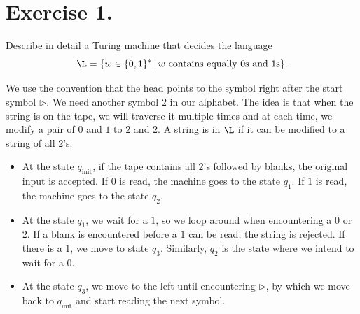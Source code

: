 \section{Exercise 1.} Describe in detail a Turing machine that decides the language
$$\L=\{w\in \{0,1\}^* \,|\, w \text{ contains equally 0s and 1s}\}.$$

We use the convention that the head points to the symbol right after the start symbol $\triangleright$. We need another symbol $2$ in our alphabet. The idea is that when the string is on the tape, we will traverse it multiple times and at each time, we modify a pair of $0$ and $1$ to $2$ and $2$. A string is in $\L$ if it can be modified to a string of all $2$'s.
\begin{itemize}
  \item At the state $q_\text{init}$, if the tape contains all $2$'s followed by blanks, the original input is accepted. If $0$ is read, the machine goes to the state $q_1$. If $1$ is read, the machine goes to the state $q_2$.
  \item At the state $q_1$, we wait for a $1$, so we loop around when encountering a $0$ or $2$. If a blank is encountered before a $1$ can be read, the string is rejected. If there is a $1$, we move to state $q_3$. Similarly, $q_2$ is the state where we intend to wait for a $0$.
  \item At the state $q_3$, we move to the left until encountering $\triangleright$, by which we move back to $q_\text{init}$ and start reading the next symbol.
\end{itemize}

